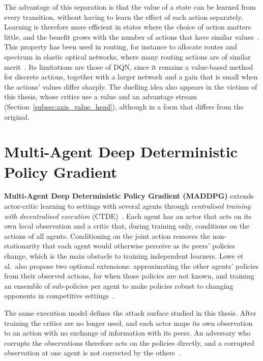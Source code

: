 The advantage of this separation is that the value of a state can be learned from every
transition, without having to learn the effect of each action separately. Learning is
therefore more efficient in states where the choice of action matters little, and the
benefit grows with the number of actions that have similar
values~\cite{wang2016duelingnetworkarchitecturesdeep,zhao2025breakingcoldstartbarrierreinforcement}.
This property has been used in routing, for instance to allocate routes and spectrum in
elastic optical networks, where many routing actions are of similar
merit~\cite{ZHANG2022108663}. Its limitations are those of DQN, since it remains a
value-based method for discrete actions, together with a larger network and a gain that
is small when the actions' values differ sharply. The duelling idea also appears in the
victims of this thesis, whose critics use a value and an advantage stream
(Section~\ref{subsec:axis_value_head}), although in a form that differs from the
original.

\section{Multi-Agent Deep Deterministic Policy Gradient}
\label{sec:lit_maddpg}

\textbf{Multi-Agent Deep Deterministic Policy Gradient (MADDPG)} extends actor-critic
learning to settings with several agents through \emph{centralised training with
decentralised execution} (CTDE)~\cite{lowe2017multi}. Each agent has an actor that acts
on its own local observation and a critic that, during training only, conditions on the
actions of all agents. Conditioning on the joint action removes the non-stationarity
that each agent would otherwise perceive as its peers' policies change, which is the
main obstacle to training independent learners. Lowe et al.\ also propose two optional
extensions: approximating the other agents' policies from their observed actions, for
when those policies are not known, and training an ensemble of sub-policies per agent to
make policies robust to changing opponents in competitive
settings~\cite{lowe2017multi}.

The same execution model defines the attack surface studied in this thesis. After
training the critics are no longer used, and each actor maps its own observation to an
action with no exchange of information with its peers. An adversary who corrupts the
observations therefore acts on the policies directly, and a corrupted observation at one
agent is not corrected by the others~\cite{10684240,pham2022c,li2025attacking}.


